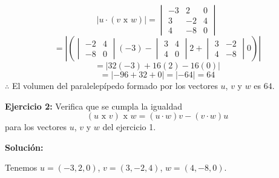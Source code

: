 \documentclass{article}
\begin{document}
$$\left| u \cdot(v\text{ x }w)\right|= \begin{vmatrix}
    -3 & 2 & 0 \\
    3 & -2 & 4 \\
    4 & -8 & 0 
\end{vmatrix}$$
$$= \left|\left(\begin{vmatrix}
    -2 & 4 \\
    -8 & 0 
\end{vmatrix}(-3) -\begin{vmatrix}
    3 & 4 \\
    4 & 0 
\end{vmatrix}2 +\begin{vmatrix}
    3 & -2 \\
    4 & -8 
\end{vmatrix}0 \right)\right|$$
$$= \left|32(-3 ) +16(2)- 16(0)\right|$$
$$= \left|-96 +32+ 0\right|  =\left|-64 \right| = 64 $$
$\therefore$ El volumen del paralelepípedo formado por los vectores $u$, $v$ y $w$ es $64$.
\vspace{10pt}

\textbf{Ejercicio 2:} Verifica que se cumpla la igualdad $$(u \text{ x } v)\text{ x }w = (u\cdot w)v -(v\cdot w)u$$ para los 
vectores $u$, $v$ y $w$ del ejercicio 1.
\vspace{10pt}

\textbf{Solución:}
\vspace{10pt}

Tenemos $u =(-3, 2, 0)$, $v =(3,-2, 4)$, $w =(4,-8,0)$.
\vspace{10pt}
\end{document}

